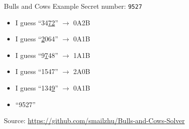 \documentclass[10pt]{beamer}
\begin{document}
\begin{frame}{Bulls and Cows Example}
Secret number: \texttt{9527}
\begin{itemize}[<+(1)->]
    \item I guess ``34\underline{72}'' $\rightarrow$ 0A2B
    \item I guess ``\underline{2}064'' $\rightarrow$ 0A1B
    \item I guess ``\alert{9}\underline{7}48'' $\rightarrow$ 1A1B
    \item I guess ``1\alert{5}4\alert{7}'' $\rightarrow$ 2A0B
    \item I guess ``134\underline{9}'' $\rightarrow$ 0A1B
    \item ``9527''
\end{itemize}

Source: \url{https://github.com/smailzhu/Bulls-and-Cows-Solver}


\end{frame}

\end{document}
